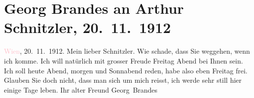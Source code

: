 

               \section[Georg Brandes an Arthur Schnitzler, 20. 11. 1912]{ Georg Brandes an Arthur Schnitzler, 20. 11. 1912}\nopagebreak{}\rehead{ }\normalsize\beginnumbering{} \toendnotes[C]{\smallbreak\pagebreak[2]} 
\pstart
           \raggedleft{}{\pb}\textcolor{pink}{Wien}{}\ledrightnote{\textcolor{pink}{Wien}}, 20. 11. 1912. \pend
           \pstart{}Mein lieber Schnitzler.\pend\pstart
           Wie schade, dass Sie weggehen, wenn ich komme. Ich will natürlich mit grosser
                    Freude Freitag Abend bei Ihnen sein.\pend
           \pstart
           Ich soll heute Abend, morgen und Sonnabend
                    reden, habe also eben Freitag frei. Glauben Sie doch nicht, dass
                    man sich um mich reisst, ich werde sehr still hier einige Tage leben.\pend
           \pstart Ihr alter Freund \spacefill\mbox{Georg Brandes}\pend{}\endnumbering{}  
      